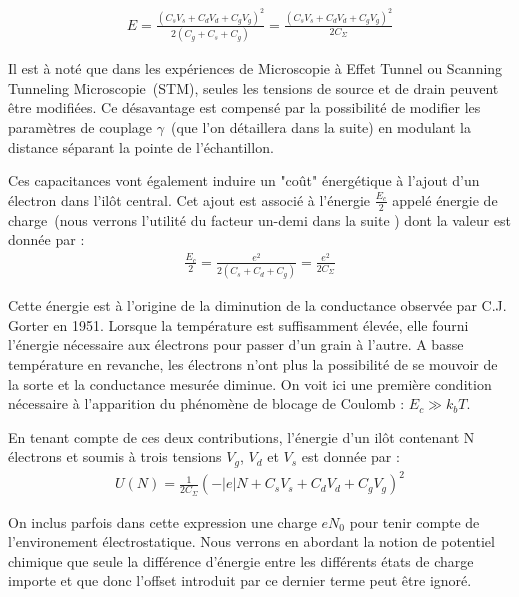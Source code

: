 \begin{eqnarray}
E = \frac{(C_sV_s + C_dV_d + C_gV_g)^2}{2(C_g + C_s + C_g)}=\frac{(C_sV_s + C_dV_d + C_gV_g)^2}{2C_{\Sigma}} \nonumber
\end{eqnarray}

Il est à noté que dans les expériences de Microscopie à Effet Tunnel ou Scanning Tunneling Microscopie~(STM), seules les tensions de source et de drain peuvent \^etre modifiées. Ce désavantage est compensé par la possibilité de modifier les paramètres de couplage $\gamma$~(que l'on détaillera dans la suite) en modulant la distance séparant la pointe de l'échantillon.

Ces capacitances vont également induire un "co\^ut" énergétique à l'ajout d'un électron dans l'il\^ot central. Cet ajout est associé à l'énergie $\frac{E_c}{2}$ appelé énergie de charge~(nous verrons l'utilité du facteur un-demi dans la suite ) dont la valeur est donnée par :
\begin{eqnarray}
\frac{E_c}{2} = \frac{e^2}{2(C_s+C_d+C_g)}=\frac{e^2}{2C_{\Sigma}} \nonumber
\end{eqnarray}


Cette énergie est à l'origine de la diminution de la conductance observée par C.J. Gorter en 1951. Lorsque la température est suffisamment élevée, elle fourni l'énergie nécessaire aux électrons pour passer d'un grain à l'autre. A basse température en revanche, les électrons n'ont plus la possibilité de se mouvoir de la sorte et la conductance mesurée diminue. On voit ici une première condition nécessaire à l'apparition du phénomène de blocage de Coulomb : $E_c \gg k_bT$.

En tenant compte de ces deux contributions, l'énergie d'un il\^ot contenant N électrons et soumis à trois tensions $V_g$, $V_d$ et $V_s$ est donnée par :
\begin{eqnarray}
U(N) = \frac{1}{2C_{\Sigma}} (-|e|N + C_sV_s + C_dV_d + C_gV_g)^2
\end{eqnarray}

On inclus parfois dans cette expression une charge $eN_0$ pour tenir compte de l'environement électrostatique. Nous verrons en abordant la notion de potentiel chimique que seule la différence d'énergie entre les différents états de charge importe et que donc l'offset introduit par ce dernier terme peut \^etre ignoré.

